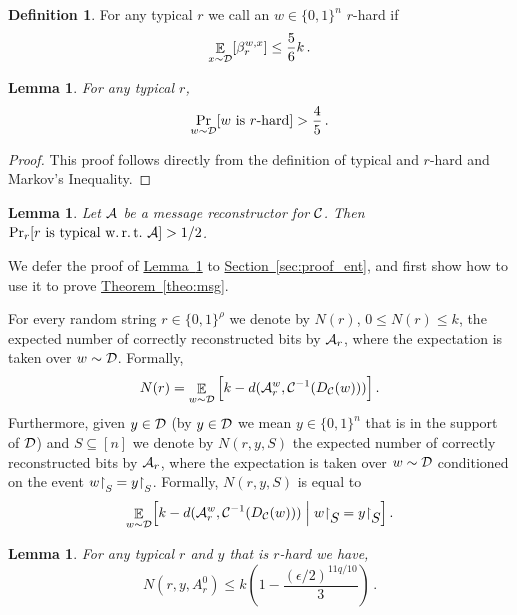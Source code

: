 \documentclass[10pt]{article}
\newtheorem{lemma}[theorem]{Lemma}
\theoremstyle{definition}
\newtheorem{definition}[theorem]{Definition}
\numberwithin{equation}{section}
\newcommand{\expref}[2]{\texorpdfstring{\hyperref[#2]{#1~\ref{#2}}}{#1~\ref{#2}}}
\DeclareMathOperator*{\Exp}{{\mathbb{E}}}
\newcommand{\ALG}{{\cal A}}
\newcommand{\DD}{{\cal D}}
\newcommand{\CC}{{\cal C}}
\newcommand{\zo}{{\{0,1\}}}
\newcommand{\DEC}{{D_{\cal C}}}
\newcommand{\rst}[1]{\ensuremath{{\mathbin\upharpoonright}%
\raise-.9ex\hbox{$#1$}}}
\newcommand{\rstsmall}[1]{\ensuremath{{\mathbin\upharpoonright}%
\raise-.9ex\hbox{\scriptsize $#1$}}}
\begin{document}
\begin{definition}
For any typical $r$ we call an $w \in \zo^n$ $r$-hard if
\[
\Exp_{x\sim\DD}[\beta_r^{w,x}]\leq\frac{5}{6}k\,.
\]
\end{definition}

\begin{lemma}\label{lem:rhard} For any typical $r$,
\[
\Pr_{w\sim \DD}[\text{$w$ is $r$-hard}] > \frac{4}{5}\,.
\] 
\end{lemma}

\begin{proof} This proof follows directly from the definition of typical and $r$-hard and Markov's Inequality. 
\end{proof}

\begin{lemma}\label{lem:ent} Let $\ALG$ be a message reconstructor for $\CC$.
%
Then $\Pr_r[\text{$r$ is typical w.\,r.\,t.\ $\ALG$}] > 1/2$.
\end{lemma}

We defer the proof of \expref{Lemma}{lem:ent} to \expref{Section}{sec:proof_ent}, and first show how to use it to prove \expref{Theorem}{theo:msg}.

For every random string $r \in \zo^\rho$ we denote by $N(r)$, $0 \leq
N(r) \leq k$, the expected number of correctly reconstructed bits by
$\ALG_r$, where the expectation is taken over $w \sim \DD$. Formally,
\[
N(r) = \Exp_{w \sim \DD}\Big[k-d(\ALG^w_r,\CC^{-1}(\DEC(w)))\Big]\,.
\]
Furthermore, given $y \in \DD$ (by $y \in \DD$ we mean $y \in \zo^n$ that is in the support of $\DD$) and $S \subseteq [n]$ we denote by $N(r,y,S)$ the expected number of correctly reconstructed bits by $\ALG_r$, where the expectation is taken over $w \sim \DD$ conditioned on the event $w\rstsmall{S} = y\rstsmall{S}$. Formally, $N(r,y,S)$ is equal to $$\Exp_{w \sim \DD}\Bigl[k-d(\ALG^w_r,\CC^{-1}(\DEC(w))) \Bigm| w\rst{S} = y\rst{S}\Bigr]\,.$$


\begin{lemma}\label{lem:ent_0} For any typical $r$ and $y$ that is
  $r$-hard we have,
\[
N(r,y,A_r^0) \leq  k \left(1-\frac{(\epsilon/2)^{11q/10}}{3}\right)\,.
\]
\end{lemma}
\end{document}
